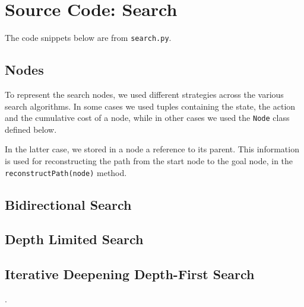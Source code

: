 \chapter{Source Code: Search}

The code snippets below are from \verb|search.py|.



\section{Nodes}
\label{sec:nodes}

To represent the search nodes, we used different strategies across the various search algorithms. In some cases we used tuples containing the state, the action and the cumulative cost of a node, while in other cases we used the \verb|Node| class defined below.

In the latter case, we stored in a node a reference to its parent. This information is used for reconstructing the path from the start node to the goal node, in the \verb|reconstructPath(node)| method.




  
  
  
\section{Bidirectional Search}
\label{sec:code_bs}





\section{Depth Limited Search}
\label{sec:code_dls}





\section{Iterative Deepening Depth-First Search}
\label{sec:code_iddfs}.

